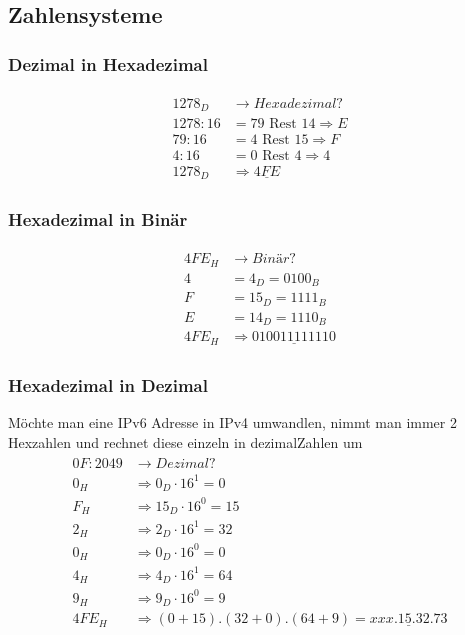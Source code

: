 \subsection{Zahlensysteme}
\subsubsection{Dezimal in Hexadezimal}	
\begin{align}
\begin{split}
	1278_D &\rightarrow Hexadezimal? \\
	1278 : 16 &= 79 \text{ Rest } 14 \Rightarrow E \\
	79 : 16 &= 4 \text{ Rest } 15 \Rightarrow F \\
	4 : 16 &= 0 \text{ Rest } 4 \Rightarrow 4 \\
	1278_D &\Rightarrow \underline{4FE}
\end{split}
\end{align}

\subsubsection{Hexadezimal in Binär}
\begin{align}
\begin{split}
	4FE_H &\rightarrow Binär? \\
	4 &= 4_D = 0100_B \\
	F &= 15_D = 1111_B \\
	E &= 14_D = 1110_B \\
	4FE_H &\Rightarrow \underline{0100 1111 1110}
\end{split}
\end{align}

\subsubsection{Hexadezimal in Dezimal}
Möchte man eine IPv6 Adresse in IPv4 umwandlen, nimmt man immer 2 Hexzahlen und rechnet diese einzeln in dezimalZahlen um
\begin{align}
\begin{split}
	0F:2049 &\rightarrow Dezimal? \\
	0_H &\Rightarrow 0_D \cdot 16^1 = 0 \\
	F_H &\Rightarrow 15_D \cdot 16^0 = 15 \\
	2_H &\Rightarrow 2_D \cdot 16^1 = 32 \\
	0_H &\Rightarrow 0_D \cdot 16^0 = 0 \\
	4_H &\Rightarrow 4_D \cdot 16^1 = 64 \\
	9_H &\Rightarrow 9_D \cdot 16^0 = 9 \\
	4FE_H &\Rightarrow (0+15) . (32 + 0) . (64 + 9) = \underline{xxx.15.32.73}
\end{split}
\end{align}

